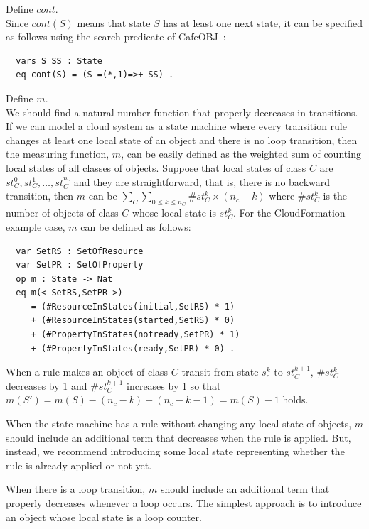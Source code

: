 \documentclass[12pt]{report}
\newcommand{\cafeobj}{{\sf CafeOBJ}~}
\begin{document}
 Define $cont$. \\ Since $cont(S)$ means that
state $S$ has at least one next state, it can be specified as follows
using the search predicate of \cafeobj:
\small
\begin{verbatim}
  vars S SS : State
  eq cont(S) = (S =(*,1)=>+ SS) .
\end{verbatim}
\normalsize
 Define $m$. \\ We should find a natural
number function that properly decreases in transitions. If we can
model a cloud system as a state machine where every transition rule
changes at least one local state of an object and there is no loop
transition, then the measuring function, $m$, can be easily defined as
the weighted sum of counting local states of all classes of objects.
Suppose that local states of class $C$ are $st_C^0, st_C^1, \dots ,
st_C^{n_c}$ and they are straightforward, that is, there is no
backward transition, then $m$ can be $\sum_{C} \sum_{0 \le k \le n_C}
\#st_C^k \times (n_c - k)$ where $\#st_C^k$ is the number of objects
of class $C$ whose local state is $st_C^k$. For the CloudFormation
example case, $m$ can be defined as follows:
\small
\begin{verbatim}
  var SetRS : SetOfResource
  var SetPR : SetOfProperty
  op m : State -> Nat
  eq m(< SetRS,SetPR >)
     = (#ResourceInStates(initial,SetRS) * 1) 
     + (#ResourceInStates(started,SetRS) * 0)
     + (#PropertyInStates(notready,SetPR) * 1) 
     + (#PropertyInStates(ready,SetPR) * 0) .
\end{verbatim}
\normalsize
When a rule makes an object of class $C$ transit from state $s_c^k$ to
$st_C^{k+1}$, $\#st_C^k$ decreases by 1 and $\#st_C^{k+1}$ increases by 1 so that
$m(S')=m(S)-(n_c-k)+(n_c-k-1)=m(S)-1$ holds.

When the state machine has a rule without changing any local state
of objects, $m$ should include an additional term that decreases when
the rule is applied. But, instead, we recommend introducing some local
state representing whether the rule is already applied or not yet.

When there is a loop transition, $m$ should include an additional term
that properly decreases whenever a loop occurs. The simplest approach
is to introduce an object whose local state is a loop counter.\\
\end{document}
